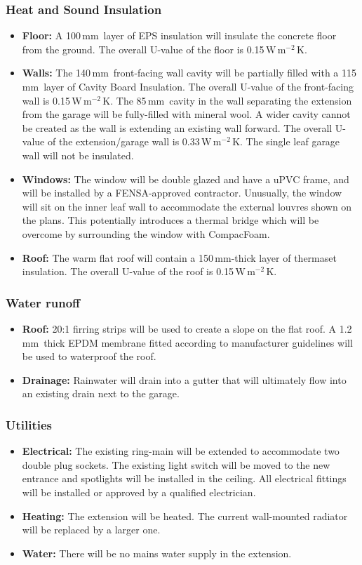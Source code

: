 \documentclass{extension}
\newcommand{\mm}{\,$\mathrm{mm}$}
\newcommand{\uunit}{\,$\mathrm{W\,m^{-2}\,K}$}
\begin{document}
\subsubsection{Heat and Sound Insulation}
\begin{itemize}
  \item {\bf Floor:} A 100\mm\ layer of EPS\cite{efins} insulation will insulate the concrete floor from the ground. The overall U-value of the floor is 0.15\uunit .
  \item {\bf Walls:} The 140\mm\ front-facing wall cavity will be partially filled with a 115\mm\ layer of Cavity Board Insulation.\cite{ew1ins} The overall U-value of the front-facing wall is 0.15\uunit . The 85\mm\ cavity in the wall separating the extension from the garage will be fully-filled with mineral wool.\cite{ew2ins} A wider cavity cannot be created as the wall is extending an existing wall forward. The overall U-value of the extension/garage wall is 0.33\uunit. The single leaf garage wall will not be insulated.
  \item {\bf Windows:} The window will be double glazed and have a uPVC frame, and will be installed by a FENSA-approved contractor. Unusually, the window will sit on the inner leaf wall to accommodate the external louvres shown on the plans. This potentially introduces a thermal bridge which will be overcome by surrounding the window with CompacFoam.\cite{cfoam}
  \item {\bf Roof:} The warm flat roof will contain a 150\mm -thick layer of thermaset insulation.\cite{erins} The overall U-value of the roof is 0.15\uunit .
\end{itemize}
\subsubsection{Water runoff}
\begin{itemize}
  \item {\bf Roof:} 20:1 firring strips will be used to create a slope on the flat roof. A 1.2\mm\ thick EPDM membrane\cite{prmem} fitted according to manufacturer guidelines will be used to waterproof the roof.
  \item {\bf Drainage:} Rainwater will drain into a gutter that will ultimately flow into an existing drain next to the garage.
\end{itemize}
\subsubsection{Utilities}
\begin{itemize}
  \item {\bf Electrical:} The existing ring-main will be extended to accommodate two double plug sockets. The existing light switch will be moved to the new entrance and spotlights will be installed in the ceiling. All electrical fittings will be installed or approved by a qualified electrician.
  \item {\bf Heating:} The extension will be heated. The current wall-mounted radiator will be replaced by a larger one.
  \item {\bf Water:} There will be no mains water supply in the extension.
\end{itemize}
\end{document}
